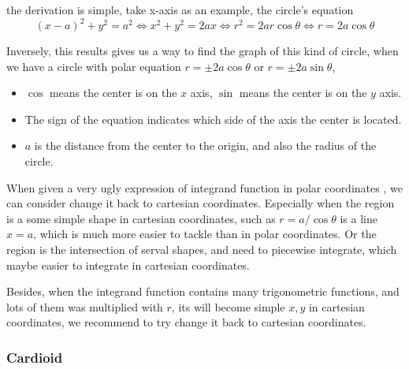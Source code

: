\documentclass[a4]{overview}
\begin{document}
the derivation is simple, take x-axis as an example, the circle's equation
\[
	(x-a)^2 + y^2 = a^2 \iff x^2 + y^2 = 2ax
	\iff r^2 = 2ar\cos\theta \iff r = 2a\cos\theta
\] 

Inversely, this results gives us a way to find the graph of this kind of circle,
when we have a circle with polar equation $r = \pm 2a \cos\theta$ or $r = \pm 2a \sin\theta$, 
\begin{itemize}
	\item $\cos$ means the center is on the $x$ axis, $\sin$ means the center is on the $y$ axis.
	\item The sign of the equation indicates which side of the axis the center is located.
	\item  $a$ is the distance from the center to the origin, and also the radius of the circle.
\end{itemize}

\begin{remark}
	When given a very ugly expression of integrand function in polar coordinates
	, we can consider change it back to cartesian coordinates. Especially when
	the region is a some simple shape in cartesian coordinates, such as $r=a / \cos \theta$
	is a line  $x=a$, which is much more easier to tackle than in polar coordinates.
	Or the region is the intersection of serval shapes, and need to piecewise integrate,
	which maybe easier to integrate in cartesian coordinates.

	Besides, when the integrand function contains many trigonometric functions,
	and lots of them was multiplied with $r$, its will become simple  $x, y$ in
	 cartesian coordinates, we recommend to try change it back to cartesian coordinates.
\end{remark}

\subsubsection{Cardioid}

\begin{center}
\end{center}
\end{document}
